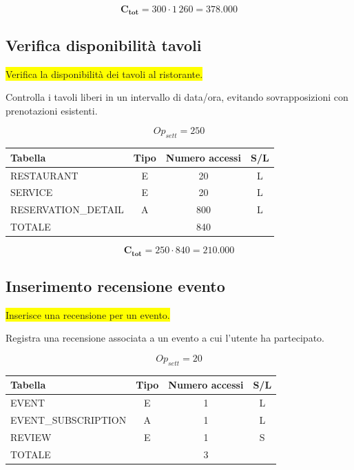 \documentclass[a4paper,12pt]{report}
\begin{document}
$$\mathbf{C_{tot}} = 300 \cdot 1\,260 = \mathbf{378.000}$$

\subsection*{Verifica disponibilità tavoli} \label{op8}
\colorbox{yellow}{Verifica la disponibilità dei tavoli al ristorante.}

Controlla i tavoli liberi in un intervallo di data/ora, evitando
sovrapposizioni con prenotazioni esistenti.

$$Op_{sett} = 250$$

\begin{table}[H]
  \centering
  \small
  \renewcommand{\arraystretch}{1.15}
  \begin{tabularx}{0.8\textwidth}{|X|c|c|c|}
    \hline
    \rowcolor{gray!20}
    \textbf{Tabella} & \textbf{Tipo} & \textbf{Numero accessi} & \textbf{S/L} \\
    \hline
    RESTAURANT & E & 20 & L \\
    SERVICE & E & 20 & L \\
    RESERVATION\_DETAIL & A & 800 & L \\
    \hline
    \rowcolor{gray!20}
    TOTALE & & 840 & \\
    \hline
  \end{tabularx}
  \vspace{-1em}
\end{table}

$$\mathbf{C_{tot}} = 250 \cdot 840 = \mathbf{210.000}$$

\subsection*{Inserimento recensione evento} \label{op9}
\colorbox{yellow}{Inserisce una recensione per un evento.}

Registra una recensione associata a un evento a cui l'utente ha partecipato.

$$Op_{sett} = 20$$

\begin{table}[H]
  \centering
  \small
  \renewcommand{\arraystretch}{1.15}
  \begin{tabularx}{0.8\textwidth}{|X|c|c|c|}
    \hline
    \rowcolor{gray!20}
    \textbf{Tabella} & \textbf{Tipo} & \textbf{Numero accessi} & \textbf{S/L} \\
    \hline
    EVENT & E & 1 & L \\
    EVENT\_SUBSCRIPTION & A & 1 & L \\
    REVIEW & E & 1 & S \\
    \hline
    \rowcolor{gray!20}
    TOTALE & & 3 & \\
    \hline
  \end{tabularx}
  \vspace{-1em}
\end{table}
\end{document}

